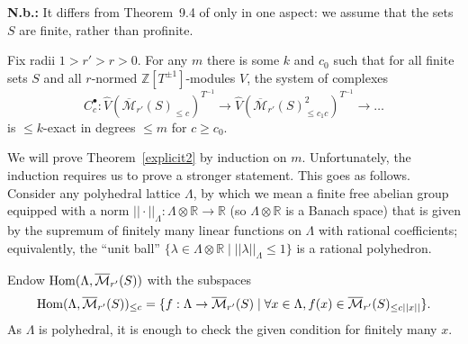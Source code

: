 \textbf{N.b.:}
It differs from Theorem~9.4 of \cite{Analytic} only in one aspect:
we assume that the sets $S$ are finite, rather than profinite.

\begin{theorem}
  \label{explicit2}
	Fix radii $1>r'>r>0$. For any $m$ there is some $k$ and $c_0$ such that for all finite sets $S$ and all $r$-normed $\mathbb Z[T^{\pm 1}]$-modules $V$, the system of complexes
\[
C_c^\bullet: \widehat{V}(\overline{\mathcal M}_{r'}(S)_{\leq c})^{T^{-1}}\to \widehat{V}(\overline{\mathcal M}_{r'}(S)_{\leq c_1c}^2)^{T^{-1}}\to \ldots
\]
is $\leq k$-exact in degrees $\leq m$ for $c\geq c_0$.
\end{theorem}




We will prove Theorem~\ref{explicit2} by induction on $m$. Unfortunately, the induction requires us to prove a stronger statement. This goes as follows. Consider any polyhedral lattice $\Lambda$, by which we mean a finite free abelian group equipped with a norm $||\cdot||_\Lambda: \Lambda\otimes \mathbb R\to \mathbb R$ (so $\Lambda\otimes \mathbb R$ is a Banach space) that is given by the supremum of finitely many linear functions on $\Lambda$ with rational coefficients; equivalently, the ``unit ball'' $\{\lambda\in \Lambda\otimes \mathbb R\mid ||\lambda||_\Lambda\leq 1\}$ is a rational polyhedron.

Endow $\operatorname{Hom}(\Lambda,\overline{\mathcal M}_{r'}(S))$ with the subspaces
\[
\operatorname{Hom}(\Lambda,\overline{\mathcal M}_{r'}(S))_{\leq c} = \{f: \Lambda\to \overline{\mathcal M}_{r'}(S)\mid \forall x\in \Lambda, f(x)\in \overline{\mathcal M}_{r'}(S)_{\leq c||x||}\}.
\]
As $\Lambda$ is polyhedral, it is enough to check the given condition for finitely many $x$.

